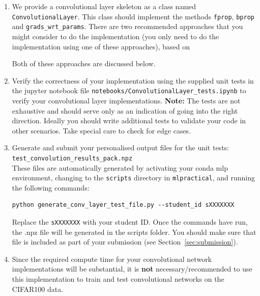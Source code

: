 \documentclass[11pt,]{article}
\begin{document}
\begin{enumerate}
  \item We provide a convolutional layer skeleton as a class named \texttt{ConvolutionalLayer}.  This class should implement the methods \texttt{fprop}, \texttt{bprop} and \texttt{grads\_wrt\_params}.  There are two recommended approaches that you might consider to do the implementation (you only need to do the implementation using one of these approaches), based on
  Both of these approaches are discussed below.
 
  \item Verify the correctness of your implementation using the supplied unit tests in the jupyter notebook file \texttt{notebooks/ConvolutionalLayer\_tests.ipynb} to verify your convolutional layer implementations. \textbf{Note:} The tests are not exhaustive and should serve only as an indication of going into the right direction. Ideally you should write additional tests to validate your code in other scenarios. Take special care to check for edge cases.

\item Generate and submit your personalised output files for the unit tests: \texttt{test\_convolution\_results\_pack.npz}\\
These files are automatically generated by activating your conda mlp environment, changing to the \texttt{scripts} directory in \texttt{mlpractical},  and running the following commands: 
 \begin{verbatim}
python generate_conv_layer_test_file.py --student_id sXXXXXXX
\end{verbatim}
Replace the \texttt{sXXXXXXX} with your student ID. Once the commands have run, the .npz file will be generated in the scripts folder. You should make sure that file is included as part of your submission (see Section~\ref{sec:submission}).
  
\item Since the required compute time for your convolutional network implementations will be substantial, it is \textbf{not} necessary/recommended to use this implementation to train and test convolutional networks on the CIFAR100 data.
\end{enumerate}
\end{document}
